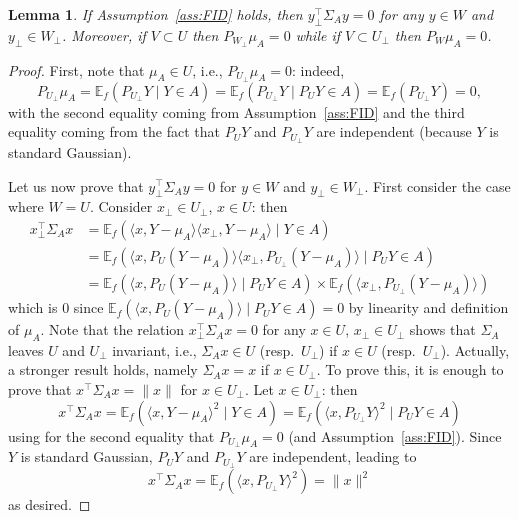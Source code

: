 \documentclass[]{article}
\newcommand{\E}{\mathbb{E}}
\theoremstyle{plain}
\newtheorem{lemma}{Lemma}[section]
\theoremstyle{definition}
\begin{document}
\begin{lemma} \label{lemma:Sigma-A-mu-A-W}
	If Assumption~\ref{ass:FID} holds, then $y_\perp^\top \Sigma_A y = 0$ for any $y \in W$ and $y_\perp \in W_\perp$. Moreover, if $V \subset U$ then $P_{W_\perp} \mu_A = 0$ while if $V \subset U_\perp$ then $P_W \mu_A = 0$.
\end{lemma}

\begin{proof}
	First, note that $\mu_A \in U$, i.e., $P_{U_\perp} \mu_A = 0$: indeed,
	\[ P_{U_\perp} \mu_A = \E_f(P_{U_\perp} Y \mid Y \in A) = \E_f(P_{U_\perp} Y \mid P_U Y \in A) = \E_f(P_{U_\perp} Y) = 0, \]
	with the second equality coming from Assumption~\ref{ass:FID} and the third equality coming from the fact that $P_U Y$ and $P_{U_\perp} Y$ are independent (because $Y$ is standard Gaussian).
	
	Let us now prove that $y_\perp^\top \Sigma_A y = 0$ for $y \in W$ and $y_\perp \in W_\perp$. First consider the case where $W = U$. Consider $x_\perp \in U_\perp$, $x \in U$: then
	\begin{align*}
		x_\perp^\top \Sigma_A x & = \E_f ( \langle x, Y - \mu_A \rangle \langle x_\perp, Y - \mu_A \rangle \mid Y \in A)\\
		& = \E_f ( \langle x, P_U (Y - \mu_A) \rangle \langle x_\perp, P_{U_\perp} (Y - \mu_A) \rangle \mid P_U Y \in A)\\
		& = \E_f ( \langle x, P_U (Y - \mu_A) \rangle \mid P_U Y \in A) \times \E_f ( \langle x_\perp, P_{U_\perp} (Y - \mu_A) \rangle)
	\end{align*}
	which is $0$ since $\E_f ( \langle x, P_U (Y - \mu_A) \rangle \mid P_U Y \in A) = 0$ by linearity and definition of $\mu_A$. Note that the relation $x^\top_\perp \Sigma_A x = 0$ for any $x \in U$, $x_\perp \in U_\perp$ shows that $\Sigma_A$ leaves $U$ and $U_\perp$ invariant, i.e., $\Sigma_A x \in U$ (resp.\ $U_\perp$) if $x \in U$ (resp.\ $U_\perp$). Actually, a stronger result holds, namely $\Sigma_A x = x$ if $x \in U_\perp$. To prove this, it is enough to prove that $x^\top \Sigma_A x = \lVert x \rVert$ for $x \in U_\perp$. Let $x \in U_\perp$: then
	\[ x^\top \Sigma_A x = \E_f \left( \langle x, Y - \mu_A \rangle^2 \mid Y \in A \right) = \E_f \left( \langle x, P_{U_\perp} Y \rangle^2 \mid P_U Y \in A \right) \]
	using for the second equality that $P_{U_\perp} \mu_A = 0$ (and Assumption~\ref{ass:FID}). Since $Y$ is standard Gaussian, $P_U Y$ and $P_{U_\perp} Y$ are independent, leading to
	\[ x^\top \Sigma_A x = \E_f \left( \langle x, P_{U_\perp} Y \rangle^2 \right) = \lVert x \rVert^2 \]
	as desired.
	

\end{proof}
\end{document}
